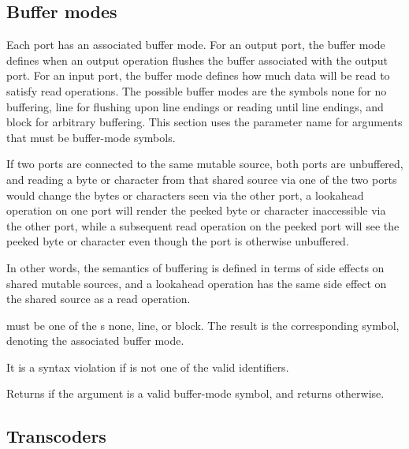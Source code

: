 \subsection{Buffer modes}

Each port has an associated buffer mode.  For an output port, the
buffer mode defines when an output operation flushes the buffer
associated with the output port.  For an input port, the buffer mode
defines how much data will be read to satisfy read operations.  The
possible buffer modes are the symbols {\cf none} for no buffering,
{\cf line} for flushing upon line endings or reading until line
endings, and {\cf block} for arbitrary buffering.  This section uses
the parameter name  for arguments that must be
buffer-mode symbols.

If two ports are connected to the same mutable source, both ports
are unbuffered, and reading a byte or character from that shared
source via one of the two ports would change the bytes or characters
seen via the other port, a lookahead operation on one port will
render the peeked byte or character inaccessible via the other port,
while a subsequent read operation on the peeked port will see the
peeked byte or character even though the port is otherwise unbuffered.

In other words, the semantics of buffering is defined in terms of side
effects on shared mutable sources, and a lookahead operation has the
same side effect on the shared source as a read operation.

\begin{entry}{%
}
   
 must be one of the s {\cf none}, {\cf line}, or
{\cf block}. The result is the corresponding symbol, denoting the
associated buffer mode.

It is a syntax violation if  is not one of the valid
identifiers.
\end{entry}

\begin{entry}{%
}
   
Returns \schtrue{} if the argument is a valid buffer-mode symbol,
and returns \schfalse{} otherwise.
\end{entry}

\subsection{Transcoders}
\label{transcoderssection}

